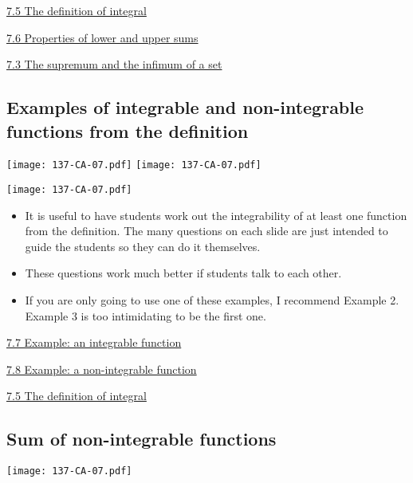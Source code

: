\documentclass[11pt]{article}
\newcommand{\nl}{\hfill \vspace{-1.1\baselineskip}} %
\newcommand{\viii}{\hspace{8mm} \href{https://www.youtube.com/watch?v=4qNstDwlh9I&list=PLlwePzQY_wW9vqCkUudCmoOvnNmr9vMuJ&index=3}{7.3 The supremum and the infimum of a set}}
\newcommand{\vv}{\hspace{8mm} \href{https://www.youtube.com/watch?v=dZ_TWQbksbg&list=PLlwePzQY_wW9vqCkUudCmoOvnNmr9vMuJ&index=5}{7.5 The definition of integral}}
\newcommand{\vvi}{\hspace{8mm} \href{https://www.youtube.com/watch?v=Ev2w9NYqNvc&list=PLlwePzQY_wW9vqCkUudCmoOvnNmr9vMuJ&index=6}{7.6 Properties of lower and upper sums}}
\newcommand{\vvii}{\hspace{8mm} \href{https://www.youtube.com/watch?v=si1Ds7TrP14&list=PLlwePzQY_wW9vqCkUudCmoOvnNmr9vMuJ&index=7}{7.7 Example: an integrable function}}
\newcommand{\vviii}{\hspace{8mm} \href{https://www.youtube.com/watch?v=N1R26svx9ZA&list=PLlwePzQY_wW9vqCkUudCmoOvnNmr9vMuJ&index=8}{7.8 Example: a non-integrable function}}
\begin{document}
\begin{videos}
\vv

\vvi

\viii
\end{videos}

\newpage
\subsection{Examples of integrable and non-integrable functions from the definition}

\begin{center}
{ \texttt{[image: 137-CA-07.pdf]}} \quad
{ \texttt{[image: 137-CA-07.pdf]}} 

{ \texttt{[image: 137-CA-07.pdf]}} 
\end{center}

\begin{comments}
\nl
	\begin{itemize}
		\item It is useful to have students work out the integrability of at least one function from the definition.  The many questions on each slide are just intended to guide the students so they can do it themselves. 
		\item These questions work much better if students talk to each other.
		\item If you are only going to use one of these examples, I recommend Example 2.  Example 3 is too intimidating to be the first one.
	\end{itemize}
\end{comments}

\begin{videos}
\vvii

\vviii

\vv
\end{videos}

\newpage
\subsection{Sum of non-integrable functions}

\begin{center}
{ \texttt{[image: 137-CA-07.pdf]}} 
\end{center}
\end{document}
